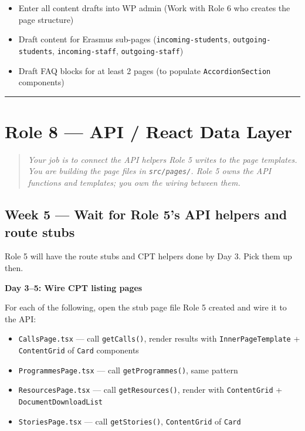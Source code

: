 \documentclass[11pt,a4paper]{article}
\newcommand{\grouprule}{\vspace{0.3em}\textcolor{ruleLine}{\rule{\linewidth}{0.4pt}}\vspace{0.3em}}
\begin{document}
\begin{itemize}
\item Enter all content drafts into WP admin (Work with Role 6 who creates the page structure)
\item Draft content for Erasmus sub-pages (\nolinkurl{incoming-students}, \nolinkurl{outgoing-students}, \nolinkurl{incoming-staff}, \nolinkurl{outgoing-staff})
\item Draft FAQ blocks for at least 2 pages (to populate \nolinkurl{AccordionSection} components)
\end{itemize}

\grouprule

\section{Role 8 — API / React Data Layer}

\begin{quote}\itshape
Your job is to connect the API helpers Role 5 writes to the page templates. You are building the page files in \nolinkurl{src/pages/}. Role 5 owns the API functions and templates; you own the wiring between them.
\end{quote}

\subsection{Week 5 — Wait for Role 5's API helpers and route stubs}

Role 5 will have the route stubs and CPT helpers done by Day 3. Pick them up then.

\textbf{Day 3–5: Wire CPT listing pages}

For each of the following, open the stub page file Role 5 created and wire it to the API:

\begin{itemize}
\item \nolinkurl{CallsPage.tsx} — call \nolinkurl{getCalls()}, render results with \nolinkurl{InnerPageTemplate} + \nolinkurl{ContentGrid} of \nolinkurl{Card} components
\item \nolinkurl{ProgrammesPage.tsx} — call \nolinkurl{getProgrammes()}, same pattern
\item \nolinkurl{ResourcesPage.tsx} — call \nolinkurl{getResources()}, render with \nolinkurl{ContentGrid} + \nolinkurl{DocumentDownloadList}
\item \nolinkurl{StoriesPage.tsx} — call \nolinkurl{getStories()}, \nolinkurl{ContentGrid} of \nolinkurl{Card}
\end{itemize}
\end{document}
